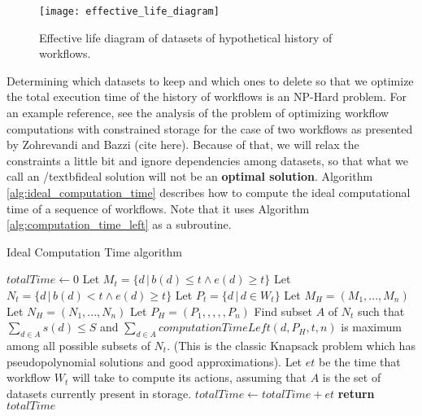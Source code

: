 \begin{figure}
\centering
\texttt{[image: effective\_life\_diagram]}
\caption{Effective life diagram of datasets of hypothetical history of workflows.}
\label{fig:effective_life}
\end{figure}

Determining which datasets to keep and which ones to delete so that we optimize the total execution time of the history of workflows is an NP-Hard problem.  For an example reference, see the analysis of the problem of optimizing workflow computations with constrained storage for the case of two workflows as presented by Zohrevandi and Bazzi (cite here).  Because of that, we will relax the constraints a little bit and ignore dependencies among datasets, so that what we call an /textbf{ideal solution} will not be an \textbf{optimal solution}.  Algorithm \ref{alg:ideal_computation_time} describes how to compute the ideal computational time of a sequence of workflows.  Note that it uses Algorithm \ref{alg:computation_time_left} as a subroutine.


\begin{algorithm}
\begin{singlespace}
\caption{Ideal Computation Time algorithm}
\label{alg:ideal_computation_time}
\begin{algorithmic}[1]
	\State $totalTime \gets 0$
		\State Let $M_t = \{ d\, |\, b(d) \leq t \wedge e(d) \geq t \}$
		\State Let $N_t = \{ d\, |\, b(d) < t \wedge e(d) \geq t \}$ 
		\State Let $P_t = \{ d\, |\, d \in W_t \}$ 
	\EndFor
	\State Let $M_H = (M_1, ..., M_n)$
	\State Let $N_H = (N_1, ..., N_n)$
	\State Let $P_H = (P_1, ,,,, P_n)$
		\State Find subset $A$ of $N_t$ such that $\sum_{d \in A}{s(d)} \leq S$ and $\sum_{d \in A}{computationTimeLeft(d, P_H, t, n)}$ is maximum among all possible subsets of $N_t$.  (This is the classic Knapsack problem which has pseudopolynomial solutions and good approximations).
		\State Let $et$ be the time that workflow $W_t$ will take to compute its actions, assuming that $A$ is the set of datasets currently present in storage.
		\State $totalTime \gets totalTime + et$
	\EndFor
	\State \textbf{return} $totalTime$
\EndProcedure
\end{algorithmic}
\end{singlespace}
\end{algorithm}

